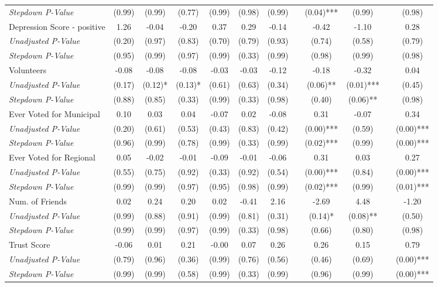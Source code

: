 \begin{tabular}{l c c c c c c c c c c c}
\quad \textit{Stepdown P-Value} & (0.99) & (0.99) & (0.77) & (0.99) & (0.98) & (0.99) & & (0.04)*** & (0.99) & & (0.98) \\
Depression Score - positive & 1.26 & -0.04 & -0.20 & 0.37 & 0.29 & -0.14 & & -0.42 & -1.10 & & 0.28 \\
\quad \textit{Unadjusted P-Value} & (0.20) & (0.97) & (0.83) & (0.70) & (0.79) & (0.93) & & (0.74) & (0.58) & & (0.79) \\
\quad \textit{Stepdown P-Value} & (0.95) & (0.99) & (0.97) & (0.99) & (0.33) & (0.99) & & (0.98) & (0.99) & & (0.98) \\
Volunteers & -0.08 & -0.08 & -0.08 & -0.03 & -0.03 & -0.12 & & -0.18 & -0.32 & & 0.04 \\
\quad \textit{Unadjusted P-Value} & (0.17) & (0.12)* & (0.13)* & (0.61) & (0.63) & (0.34) & & (0.06)** & (0.01)*** & & (0.45) \\
\quad \textit{Stepdown P-Value} & (0.88) & (0.85) & (0.33) & (0.99) & (0.33) & (0.98) & & (0.40) & (0.06)** & & (0.98) \\
Ever Voted for Municipal & 0.10 & 0.03 & 0.04 & -0.07 & 0.02 & -0.08 & & 0.31 & -0.07 & & 0.34 \\
\quad \textit{Unadjusted P-Value} & (0.20) & (0.61) & (0.53) & (0.43) & (0.83) & (0.42) & & (0.00)*** & (0.59) & & (0.00)*** \\
\quad \textit{Stepdown P-Value} & (0.96) & (0.99) & (0.78) & (0.99) & (0.33) & (0.99) & & (0.02)*** & (0.99) & & (0.00)*** \\
Ever Voted for Regional & 0.05 & -0.02 & -0.01 & -0.09 & -0.01 & -0.06 & & 0.31 & 0.03 & & 0.27 \\
\quad \textit{Unadjusted P-Value} & (0.55) & (0.75) & (0.92) & (0.33) & (0.92) & (0.54) & & (0.00)*** & (0.84) & & (0.00)*** \\
\quad \textit{Stepdown P-Value} & (0.99) & (0.99) & (0.97) & (0.95) & (0.98) & (0.99) & & (0.02)*** & (0.99) & & (0.01)*** \\
Num. of Friends & 0.02 & 0.24 & 0.20 & 0.02 & -0.41 & 2.16 & & -2.69 & 4.48 & & -1.20 \\
\quad \textit{Unadjusted P-Value} & (0.99) & (0.88) & (0.91) & (0.99) & (0.81) & (0.31) & & (0.14)* & (0.08)** & & (0.50) \\
\quad \textit{Stepdown P-Value} & (0.99) & (0.99) & (0.97) & (0.99) & (0.33) & (0.98) & & (0.66) & (0.80) & & (0.98) \\
Trust Score & -0.06 & 0.01 & 0.21 & -0.00 & 0.07 & 0.26 & & 0.26 & 0.15 & & 0.79 \\
\quad \textit{Unadjusted P-Value} & (0.79) & (0.96) & (0.36) & (0.99) & (0.76) & (0.56) & & (0.46) & (0.69) & & (0.00)*** \\
\quad \textit{Stepdown P-Value} & (0.99) & (0.99) & (0.58) & (0.99) & (0.33) & (0.99) & & (0.96) & (0.99) & & (0.00)*** \\
\bottomrule
\end{tabular}
